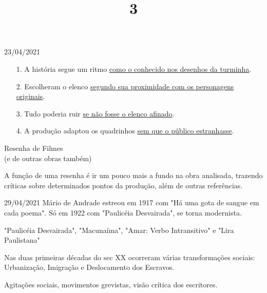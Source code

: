 \documentclass{SchoolBook}
\begin{document}
\begin{day}{23/04/2021}
        \begin{enumerate}[nosep]
                \item[1.]  A história segue um ritmo \underline{como o conhecido nos desenhos da turminha}.
                \item[2.]  Escolheram o elenco \underline{segundo sua proximidade com os personagens originais}.
                \item[3.]   Tudo poderia ruir \underline{se não fosse o elenco afinado}.
                \item[4.]   A produção adaptou os quadrinhos \underline{sem que o público estranhasse}.
        \end{enumerate}

        \title{3}{Resenha de Filmes\\(e de outras obras também)}

        A função de uma resenha é ir um pouco mais a fundo na obra analisada, trazendo críticas sobre determinados pontos da produção, além de outras referências.

    \end{day}
    
    \begin{day}{29/04/2021}
        Mário de Andrade estreou em 1917 com "Há uma gota de sangue em cada poema". Só em 1922 com "Paulicéia Desvairada", se torna modernista.
        
        "Paulicéia Desvairada", "Macunaíma", "Amar: Verbo Intransitivo" e "Lira Paulistana"
        
        Nas duas primeiras décadas do sec XX ocorreram várias transformações sociais: Urbanização, Imigração e Deslocamento dos Escravos.
        
        Agitações sociais, movimentos grevistas, visão crítica dos escritores.
    \end{day}
\end{document}
